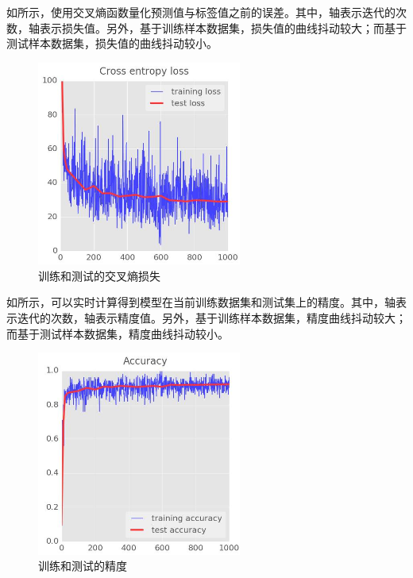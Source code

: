 \begin{content}
如所示，使用交叉熵函数量化预测值与标签值之前的误差。其中，轴表示迭代的次数，轴表示损失值。另外，基于训练样本数据集，损失值的曲线抖动较大；而基于测试样本数据集，损失值的曲线抖动较小。

\begin{figure}[H]
\centering
\includegraphics[width=0.6\textwidth]{figures/mnist-cross-entropy-loss-fig.jpeg}
\caption{训练和测试的交叉熵损失}
 \label{fig:mnist-cross-entropy-loss-fig}
\end{figure}

如所示，可以实时计算得到模型在当前训练数据集和测试集上的精度。其中，轴表示迭代的次数，轴表示精度值。另外，基于训练样本数据集，精度曲线抖动较大；而基于测试样本数据集，精度曲线抖动较小。

\begin{figure}[H]
\centering
\includegraphics[width=0.6\textwidth]{figures/mnist-accuracy-fig.jpeg}
\caption{训练和测试的精度}
 \label{fig:mnist-accuracy-fig}
\end{figure}


\end{content}
